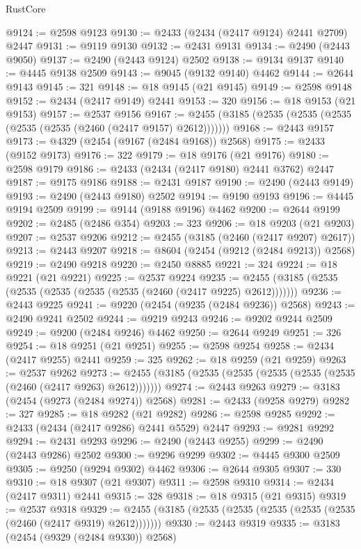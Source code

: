 \begin{lexlean}{RustCore}
\begin{coremodule}
@9124 := @2598 @9123
@9130 := @2433 (@2434 (@2417 @9124) @2441 @2709) @2447
@9131 := @9119 @9130
@9132 := @2431 @9131
@9134 := @2490 (@2443 @9050)
@9137 := @2490 (@2443 @9124) @2502
@9138 := @9134 @9137
@9140 := @4445 @9138 @2509
@9143 := @9045 (@9132 @9140) @4462
@9144 := @2644 @9143
@9145 := 321
@9148 := @18 @9145 (@21 @9145)
@9149 := @2598 @9148
@9152 := @2434 (@2417 @9149) @2441
@9153 := 320
@9156 := @18 @9153 (@21 @9153)
@9157 := @2537 @9156
@9167 := @2455 (@3185 (@2535 (@2535 (@2535 (@2535 (@2535 (@2460 (@2417 @9157) @2612)))))))
@9168 := @2443 @9157
@9173 := @4329 (@2454 (@9167 (@2484 @9168)) @2568)
@9175 := @2433 (@9152 @9173)
@9176 := 322
@9179 := @18 @9176 (@21 @9176)
@9180 := @2598 @9179
@9186 := @2433 (@2434 (@2417 @9180) @2441 @3762) @2447
@9187 := @9175 @9186
@9188 := @2431 @9187
@9190 := @2490 (@2443 @9149)
@9193 := @2490 (@2443 @9180) @2502
@9194 := @9190 @9193
@9196 := @4445 @9194 @2509
@9199 := @9144 (@9188 @9196) @4462
@9200 := @2644 @9199
@9202 := @2485 (@2486 @354)
@9203 := 323
@9206 := @18 @9203 (@21 @9203)
@9207 := @2537 @9206
@9212 := @2455 (@3185 (@2460 (@2417 @9207) @2617))
@9213 := @2443 @9207
@9218 := @8604 (@2454 (@9212 (@2484 @9213)) @2568)
@9219 := @2490 @9218
@9220 := @2450 @8885
@9221 := 324
@9224 := @18 @9221 (@21 @9221)
@9225 := @2537 @9224
@9235 := @2455 (@3185 (@2535 (@2535 (@2535 (@2535 (@2535 (@2460 (@2417 @9225) @2612)))))))
@9236 := @2443 @9225
@9241 := @9220 (@2454 (@9235 (@2484 @9236)) @2568)
@9243 := @2490 @9241 @2502
@9244 := @9219 @9243
@9246 := @9202 @9244 @2509
@9249 := @9200 (@2484 @9246) @4462
@9250 := @2644 @9249
@9251 := 326
@9254 := @18 @9251 (@21 @9251)
@9255 := @2598 @9254
@9258 := @2434 (@2417 @9255) @2441
@9259 := 325
@9262 := @18 @9259 (@21 @9259)
@9263 := @2537 @9262
@9273 := @2455 (@3185 (@2535 (@2535 (@2535 (@2535 (@2535 (@2460 (@2417 @9263) @2612)))))))
@9274 := @2443 @9263
@9279 := @3183 (@2454 (@9273 (@2484 @9274)) @2568)
@9281 := @2433 (@9258 @9279)
@9282 := 327
@9285 := @18 @9282 (@21 @9282)
@9286 := @2598 @9285
@9292 := @2433 (@2434 (@2417 @9286) @2441 @5529) @2447
@9293 := @9281 @9292
@9294 := @2431 @9293
@9296 := @2490 (@2443 @9255)
@9299 := @2490 (@2443 @9286) @2502
@9300 := @9296 @9299
@9302 := @4445 @9300 @2509
@9305 := @9250 (@9294 @9302) @4462
@9306 := @2644 @9305
@9307 := 330
@9310 := @18 @9307 (@21 @9307)
@9311 := @2598 @9310
@9314 := @2434 (@2417 @9311) @2441
@9315 := 328
@9318 := @18 @9315 (@21 @9315)
@9319 := @2537 @9318
@9329 := @2455 (@3185 (@2535 (@2535 (@2535 (@2535 (@2535 (@2460 (@2417 @9319) @2612)))))))
@9330 := @2443 @9319
@9335 := @3183 (@2454 (@9329 (@2484 @9330)) @2568)

\end{coremodule}
\end{lexlean}
